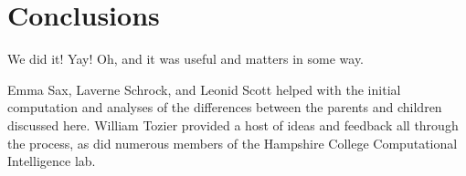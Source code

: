 
\section{Conclusions}
\label{sec:conclusions}

We did it! Yay! Oh, and it was useful and matters in some way.

\begin{acknowledgement}
	Emma Sax, Laverne Schrock, and Leonid Scott helped 
	with the initial computation and analyses of the differences between the 
	parents and children discussed here. William Tozier provided a host of 
	ideas and feedback all through the process, as did numerous members
	of the Hampshire College Computational Intelligence lab.
\end{acknowledgement}



